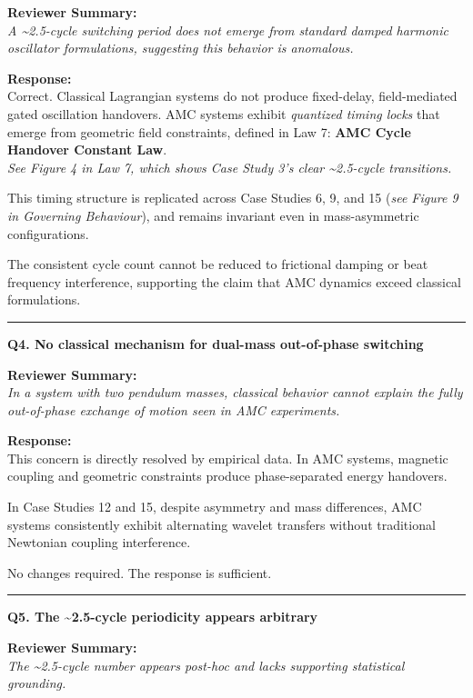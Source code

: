\documentclass[10pt,aps,pre,onecolumn,superscriptaddress,notitlepage]{revtex4-2}
\begin{document}
\textbf{Reviewer Summary:} \\
\textit{A \textasciitilde2.5-cycle switching period does not emerge from standard damped harmonic oscillator formulations, suggesting this behavior is anomalous.}

\textbf{Response:} \\
Correct. Classical Lagrangian systems do not produce fixed-delay, field-mediated gated oscillation handovers. AMC systems exhibit \textit{quantized timing locks} that emerge from geometric field constraints, defined in Law 7: \textbf{AMC Cycle Handover Constant Law}. \\
\textit{See Figure 4 in Law 7, which shows Case Study 3’s clear \textasciitilde2.5-cycle transitions.}

This timing structure is replicated across Case Studies 6, 9, and 15 (\textit{see Figure 9 in Governing Behaviour}), and remains invariant even in mass-asymmetric configurations.

The consistent cycle count cannot be reduced to frictional damping or beat frequency interference, supporting the claim that AMC dynamics exceed classical formulations.

\vspace{1em}
\hrule
\vspace{1em}

\textbf{Q4. No classical mechanism for dual-mass out-of-phase switching}

\textbf{Reviewer Summary:} \\
\textit{In a system with two pendulum masses, classical behavior cannot explain the fully out-of-phase exchange of motion seen in AMC experiments.}

\textbf{Response:} \\
This concern is directly resolved by empirical data. In AMC systems, magnetic coupling and geometric constraints produce phase-separated energy handovers.

In Case Studies 12 and 15, despite asymmetry and mass differences, AMC systems consistently exhibit alternating wavelet transfers without traditional Newtonian coupling interference.

No changes required. The response is sufficient.

\vspace{1em}
\hrule
\vspace{1em}

\textbf{Q5. The \textasciitilde2.5-cycle periodicity appears arbitrary}

\textbf{Reviewer Summary:} \\
\textit{The \textasciitilde2.5-cycle number appears post-hoc and lacks supporting statistical grounding.}
\end{document}
